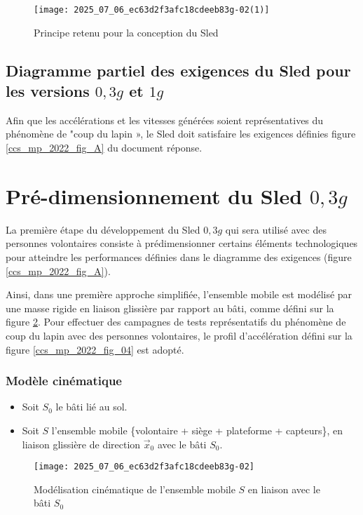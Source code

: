 \begin{figure}[!h]
\centering
\texttt{[image: 2025\_07\_06\_ec63d2f3afc18cdeeb83g-02(1)]}

\caption{Principe retenu pour la conception du Sled \label{ccs_mp_2022_fig_02}}
\end{figure}
\fi

\subsection{Diagramme partiel des exigences du Sled pour les versions $0,3 g$ et $1 g$ \label{ccs_mp_2022_sec_1B}}
\ifprof
\else
Afin que les accélérations et les vitesses générées soient représentatives du phénomène de "coup du lapin », le Sled doit satisfaire les exigences définies figure \ref{ccs_mp_2022_fig_A} du document réponse.
\fi

\section{Pré-dimensionnement du Sled $0,3 g$ \label{ccs_mp_2022_sec_2}}
\ifprof
\else
La première étape du développement du Sled $0,3 g$ qui sera utilisé avec des personnes volontaires consiste à prédimensionner certains éléments technologiques pour atteindre les performances définies dans le diagramme des exigences (figure \ref{ccs_mp_2022_fig_A}).

Ainsi, dans une première approche simplifiée, l'ensemble mobile est modélisé par une masse rigide en liaison glissière par rapport au bâti, comme défini sur la figure \ref{ccs_mp_2022_fig_03}. Pour effectuer des campagnes de tests représentatifs du phénomène de coup du lapin avec des personnes volontaires, le profil d'accélération défini sur la figure \ref{ccs_mp_2022_fig_04} est adopté.

\subsubsection*{Modèle cinématique}
\begin{itemize}
  \item Soit $S_{0}$ le bâti lié au sol.
  \item Soit $S$ l'ensemble mobile \{volontaire + siège + plateforme + capteurs\}, en liaison glissière de direction $\vec{x}_{0}$ avec le bâti $S_{0}$.
\end{itemize}

\begin{figure}[!h]
\centering
\texttt{[image: 2025\_07\_06\_ec63d2f3afc18cdeeb83g-02]}
\caption{\label{ccs_mp_2022_fig_03} Modélisation cinématique de l'ensemble mobile $S$ en liaison avec le bâti $S_{0}$}
\end{figure}



